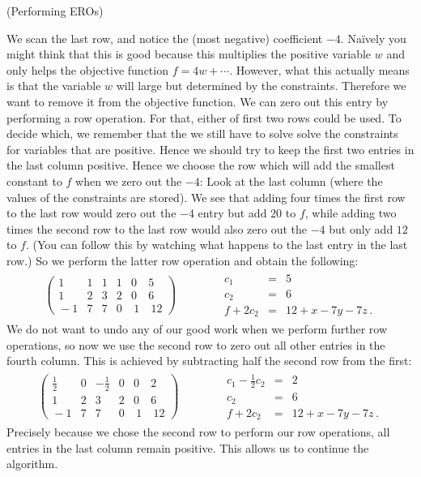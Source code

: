 \begin{example} (Performing EROs)

We scan the last row, and notice the (most negative) coefficient $-4$. Na\"ively
you might think that this is good because this multiplies the positive variable $w$
and only helps the objective function $f=4w+\cdots$. However, what this actually means
is that the variable $w$ will large but determined by the constraints. Therefore we want to remove it 
from the objective function. We can zero out this entry by performing a row operation. For that, either of first two rows could be used. 
To decide which, we remember that the we still have to solve solve the constraints for variables that are positive. Hence we should try 
to keep the first two entries in the last column positive. Hence 
we choose the row which will add the smallest constant to $f$ when we zero out the $-4$: Look at the last column (where the values of the constraints are stored). We see that adding four times the 
first row to the last row would zero out the $-4$ entry but add $20$ to $f$, while adding two  times the second row to the last row would also zero out the $-4$ but only add $12$ to $f$. (You can follow this by watching what happens to the last entry in the last row.)
So we perform the latter row operation and obtain the following:
\[
\begin{array}{c|c}
\left(
\begin{array}{rrrrr|r}
1&1&1&1&0&5\\[1mm]
1&2&3&2&0&6\\\hline
\!-1&7&7&0&\ 1&\ 12
\end{array}\right)
\quad\quad  &\quad 
\begin{array}{rcl}
c_1&=&5\\[1mm]
c_2&=&6\\
f+2c_2&=&12+x-7y-7z\, .
\end{array}
\end{array}
\]
We do not want to undo any of our good work when we perform further row operations, so now we use the second row to zero out all other entries in the fourth column. This is achieved by subtracting half the second row from the first:
\[
\begin{array}{c|c}
\left(
\begin{array}{rrrrr|r}
\frac12&0&-\frac12&0&0&2\\[1mm]
1&2&3&2&0&6\\\hline
\!-1&7&7&0&\ 1&\ 12
\end{array}\right)
\quad\quad  &\quad 
\begin{array}{rcl}
c_1-\frac12 c_2&=&2\\[1mm]
c_2&=&6\\
f+2c_2&=&12+x-7y-7z\, .
\end{array}
\end{array}
\]
Precisely because we chose the second row to perform our row operations, all entries in the last column remain positive. This allows us to continue the algorithm.


\end{example}
